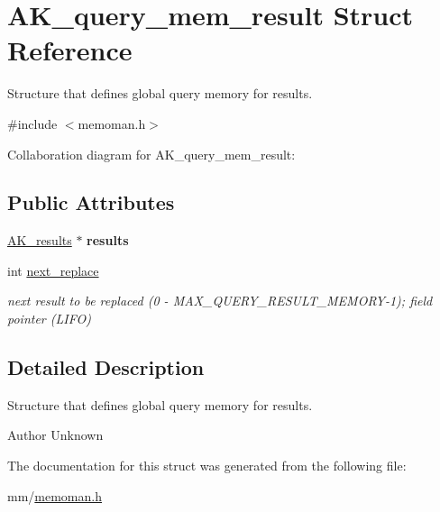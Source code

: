 \hypertarget{structAK__query__mem__result}{}\section{A\+K\+\_\+query\+\_\+mem\+\_\+result Struct Reference}
\label{structAK__query__mem__result}


Structure that defines global query memory for results.  




{\ttfamily \#include $<$memoman.\+h$>$}



Collaboration diagram for A\+K\+\_\+query\+\_\+mem\+\_\+result\+:
\subsection*{Public Attributes}
\begin{DoxyCompactItemize}
\item 
\hyperlink{structAK__results}{A\+K\+\_\+results} $\ast$ {\bfseries results}\hypertarget{structAK__query__mem__result_a59c89a5943e4a8a49e58472142b42f21}{}\label{structAK__query__mem__result_a59c89a5943e4a8a49e58472142b42f21}

\item 
int \hyperlink{structAK__query__mem__result_a444ac5bc8a61cc3da3aedb9c762666a3}{next\+\_\+replace}\hypertarget{structAK__query__mem__result_a444ac5bc8a61cc3da3aedb9c762666a3}{}\label{structAK__query__mem__result_a444ac5bc8a61cc3da3aedb9c762666a3}

\begin{DoxyCompactList}\small\item\em next result to be replaced (0 -\/ M\+A\+X\+\_\+\+Q\+U\+E\+R\+Y\+\_\+\+R\+E\+S\+U\+L\+T\+\_\+\+M\+E\+M\+O\+R\+Y-\/1); field pointer (L\+I\+FO) \end{DoxyCompactList}\end{DoxyCompactItemize}


\subsection{Detailed Description}
Structure that defines global query memory for results. 

\begin{DoxyAuthor}{Author}
Unknown 
\end{DoxyAuthor}


The documentation for this struct was generated from the following file\+:\begin{DoxyCompactItemize}
\item 
mm/\hyperlink{memoman_8h}{memoman.\+h}\end{DoxyCompactItemize}
